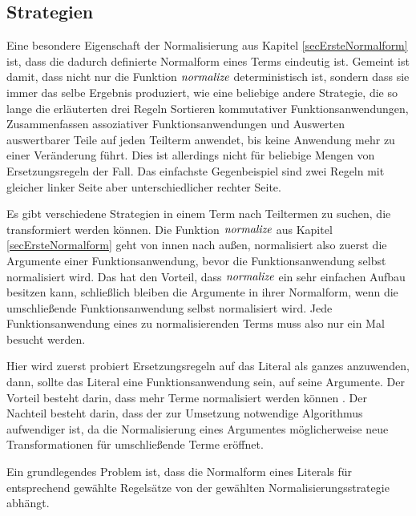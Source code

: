\subsection{Strategien}
Eine besondere Eigenschaft der Normalisierung aus Kapitel \ref{secErsteNormalform} ist, dass die dadurch definierte Normalform eines Terms eindeutig ist. Gemeint ist damit, dass nicht nur die Funktion $\mathit{normalize}$ deterministisch ist, sondern dass sie immer das selbe Ergebnis produziert, wie eine beliebige andere Strategie, die so lange die erläuterten drei Regeln Sortieren kommutativer Funktionsanwendungen, Zusammenfassen assoziativer Funktionsanwendungen und Auswerten auswertbarer Teile auf jeden Teilterm anwendet, bis keine Anwendung mehr zu einer Veränderung führt. Dies ist allerdings nicht für beliebige Mengen von Ersetzungsregeln der Fall. Das einfachste Gegenbeispiel sind zwei Regeln mit gleicher linker Seite aber unterschiedlicher rechter Seite.




Es gibt verschiedene Strategien in einem Term nach Teiltermen zu suchen, die transformiert werden können. Die Funktion $\mathit{normalize}$ aus Kapitel \ref{secErsteNormalform} geht von innen nach außen, normalisiert also zuerst die Argumente einer Funktionsanwendung, bevor die Funktionsanwendung selbst normalisiert wird. Das hat den Vorteil, dass $\mathit{normalize}$ ein sehr einfachen Aufbau besitzen kann, schließlich bleiben die Argumente in ihrer Normalform, wenn die umschließende Funktionsanwendung selbst normalisiert wird. Jede Funktionsanwendung eines zu normalisierenden Terms muss also nur ein Mal besucht werden.


Hier wird zuerst probiert Ersetzungsregeln auf das Literal als ganzes anzuwenden, dann, sollte das Literal eine Funktionsanwendung sein, auf seine Argumente. Der Vorteil besteht darin, dass mehr Terme normalisiert werden können \cite{EvalStrategien}. Der Nachteil besteht darin, dass der zur Umsetzung notwendige Algorithmus aufwendiger ist, da die Normalisierung eines Argumentes möglicherweise neue Transformationen für umschließende Terme eröffnet.

Ein grundlegendes Problem ist, dass die Normalform eines Literals für entsprechend gewählte Regelsätze von der gewählten Normalisierungsstrategie abhängt. 


















